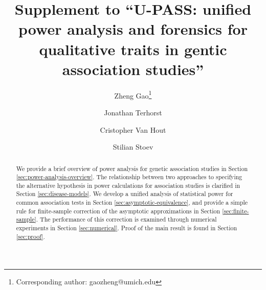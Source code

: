 \documentclass[11pt]{article}
\theoremstyle{definition}
\begin{document}


\title{Supplement to ``U-PASS: unified power analysis and forensics for qualitative traits in gentic association studies''}
\author[1]{Zheng Gao\thanks{Corresponding author: gaozheng@umich.edu}}
\author[1]{Jonathan Terhorst}
\author[2]{Cristopher Van Hout}
\author[1]{Stilian Stoev}




\maketitle

\vspace{-20pt}
\begin{abstract}
   We provide a brief overview of power analysis for genetic association studies in Section \ref{sec:power-analysis-overview}.
   The relationship between two approaches to specifying the alternative hypothesis in power calculations for association studies is clarified in Section \ref{sec:disease-models}.
   We develop a unified analysis of statistical power for common association tests in Section \ref{sec:asymptotic-equivalence}, and provide a simple rule for finite-sample correction of the asymptotic approximations in Section \ref{sec:finite-sample}.
   The performance of this correction is examined through numerical experiments in Section \ref{sec:numerical}.
   Proof of the main result is found in Section \ref{sec:proof}.
\end{abstract}
\end{document}
